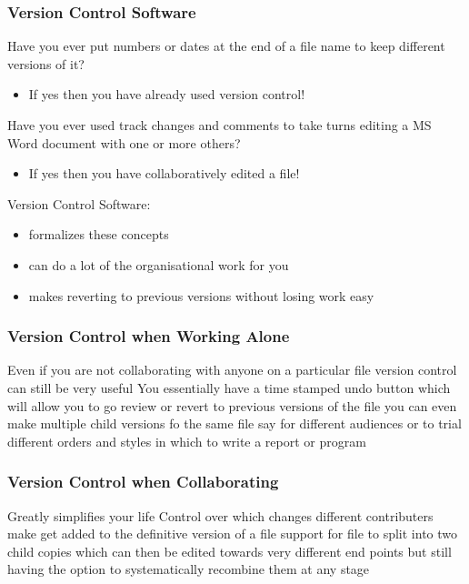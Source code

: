 \documentclass[xcolor=dvipsnames]{beamer}
\begin{document}
\begin{frame}
\frametitle{Version Control Software}
Have you ever put numbers or dates at the end of a file name to keep different versions of it? 
\begin{itemize} 
\item If yes then you have already used version control!
\newline
\newline
\end{itemize}

Have you ever used track changes and comments to take turns editing a  MS Word document with one or more others?
\begin{itemize}
\item If yes then you have collaboratively edited a file!
\newline
\newline
\end{itemize}

Version Control Software: 
\begin{itemize} 
\item formalizes these concepts
\item can do a lot of the organisational work for you
\item makes reverting to previous versions without losing work easy 
\end{itemize}
 
\end{frame}

\begin{frame}
\frametitle{Version Control when Working Alone}
Even if you are not collaborating with anyone on a particular file version control can still be very useful
You essentially have a time stamped undo button which will allow you to go review or revert to previous versions of the file
you can even make multiple child versions fo the same file say for different audiences or to trial different orders and styles in which to write a report or program
\end{frame}


\begin{frame}
\frametitle{Version Control when Collaborating}
Greatly simplifies your life
Control over which changes different contributers make get added to the definitive version of a file
support for file to split into two child copies which can then be edited towards very different end points but still having the option to systematically recombine them at any stage

\end{frame}
\end{document}
